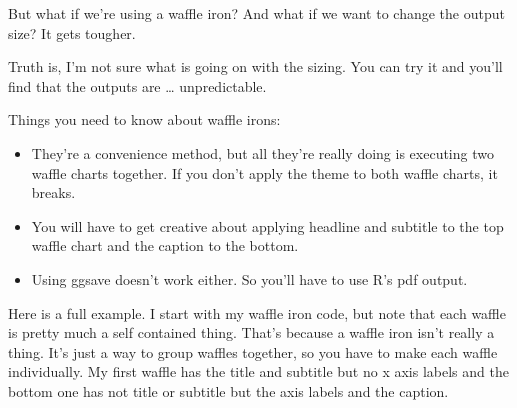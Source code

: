 \documentclass[
  letterpaper,
  DIV=11,
  numbers=noendperiod]{scrreprt}
\providecommand{\tightlist}{%
  \setlength{\itemsep}{0pt}\setlength{\parskip}{0pt}}\usepackage{longtable,booktabs,array}
\begin{document}
But what if we're using a waffle iron? And what if we want to change the
output size? It gets tougher.

Truth is, I'm not sure what is going on with the sizing. You can try it
and you'll find that the outputs are \ldots{} unpredictable.

Things you need to know about waffle irons:

\begin{itemize}
\tightlist
\item
  They're a convenience method, but all they're really doing is
  executing two waffle charts together. If you don't apply the theme to
  both waffle charts, it breaks.
\item
  You will have to get creative about applying headline and subtitle to
  the top waffle chart and the caption to the bottom.
\item
  Using ggsave doesn't work either. So you'll have to use R's pdf
  output.
\end{itemize}

Here is a full example. I start with my waffle iron code, but note that
each waffle is pretty much a self contained thing. That's because a
waffle iron isn't really a thing. It's just a way to group waffles
together, so you have to make each waffle individually. My first waffle
has the title and subtitle but no x axis labels and the bottom one has
not title or subtitle but the axis labels and the caption.
\end{document}
